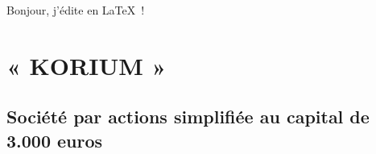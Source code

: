 \documentclass[a4paper, 11pt]{article}
\begin{document}
Bonjour, j'édite en \LaTeX~!

\section{« KORIUM »}
\subsection{Société par actions simplifiée au capital de 3.000 euros}
\end{document}
